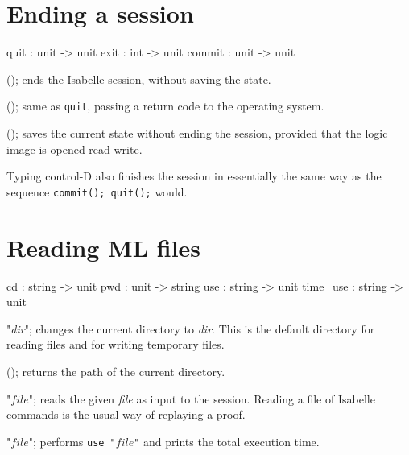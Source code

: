 \section{Ending a session}
\begin{ttbox} 
quit    : unit -> unit
exit    : int -> unit
commit  : unit -> unit
\end{ttbox}
\begin{ttdescription}
\item[\ttindexbold{quit}();] ends the Isabelle session, without saving
  the state.

\item[\ttindexbold{exit}();] same as {\tt quit}, passing a return code
  to the operating system.

\item[\ttindexbold{commit}();] saves the current state without ending
  the session, provided that the logic image is opened read-write.
\end{ttdescription}

Typing control-D also finishes the session in essentially the same way
as the sequence {\tt commit(); quit();} would.


\section{Reading ML files}
\begin{ttbox} 
cd              : string -> unit
pwd             : unit -> string
use             : string -> unit
time_use        : string -> unit
\end{ttbox}
\begin{ttdescription}
\item[\ttindexbold{cd} "{\it dir}";]
  changes the current directory to {\it dir}.  This is the default directory
  for reading files and for writing temporary files.

\item[\ttindexbold{pwd}();] returns the path of the current directory.

\item[\ttindexbold{use} "$file$";]  
reads the given {\it file} as input to the \ML{} session.  Reading a file
of Isabelle commands is the usual way of replaying a proof.

\item[\ttindexbold{time_use} "$file$";]  
performs {\tt use~"$file$"} and prints the total execution time.
\end{ttdescription}

